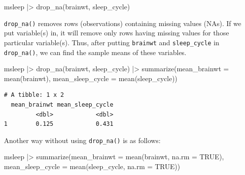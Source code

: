 \documentclass[
  letterpaper,
  DIV=11,
  numbers=noendperiod]{scrreprt}
\newenvironment{Shaded}{\begin{snugshade}}{\end{snugshade}}
\newcommand{\AttributeTok}[1]{\textcolor[rgb]{0.40,0.45,0.13}{#1}}
\newcommand{\ConstantTok}[1]{\textcolor[rgb]{0.56,0.35,0.01}{#1}}
\newcommand{\FunctionTok}[1]{\textcolor[rgb]{0.28,0.35,0.67}{#1}}
\newcommand{\NormalTok}[1]{\textcolor[rgb]{0.00,0.23,0.31}{#1}}
\newcommand{\SpecialCharTok}[1]{\textcolor[rgb]{0.37,0.37,0.37}{#1}}
\begin{document}
\begin{Shaded}
\begin{Highlighting}[]
\NormalTok{msleep }\SpecialCharTok{|\textgreater{}}
  \FunctionTok{drop\_na}\NormalTok{(brainwt, sleep\_cycle)}
\end{Highlighting}
\end{Shaded}

\begin{tcolorbox}[enhanced jigsaw, colbacktitle=quarto-callout-tip-color!10!white, opacitybacktitle=0.6, breakable, left=2mm, leftrule=.75mm, toprule=.15mm, toptitle=1mm, bottomtitle=1mm, colframe=quarto-callout-tip-color-frame, opacityback=0, coltitle=black, arc=.35mm, titlerule=0mm, colback=white, bottomrule=.15mm, title=\textcolor{quarto-callout-tip-color}{\faLightbulb}\hspace{0.5em}{Answer}, rightrule=.15mm]

\texttt{drop\_na()} removes rows (observations) containing missing
values (NAs). If we put variable(s) in, it will remove only rows having
missing values for those particular variable(s). Thus, after putting
\texttt{brainwt} and \texttt{sleep\_cycle} in \texttt{drop\_na()}, we
can find the sample means of these variables.

\begin{Shaded}
\begin{Highlighting}[]
\NormalTok{msleep }\SpecialCharTok{|\textgreater{}}
  \FunctionTok{drop\_na}\NormalTok{(brainwt, sleep\_cycle) }\SpecialCharTok{|\textgreater{}}
  \FunctionTok{summarize}\NormalTok{(}\AttributeTok{mean\_brainwt =} \FunctionTok{mean}\NormalTok{(brainwt),}
            \AttributeTok{mean\_sleep\_cycle =} \FunctionTok{mean}\NormalTok{(sleep\_cycle))}
\end{Highlighting}
\end{Shaded}

\begin{verbatim}
# A tibble: 1 x 2
  mean_brainwt mean_sleep_cycle
         <dbl>            <dbl>
1        0.125            0.431
\end{verbatim}

\end{tcolorbox}

Another way without using \texttt{drop\_na()} is as follows:

\begin{Shaded}
\begin{Highlighting}[]
\NormalTok{msleep }\SpecialCharTok{|\textgreater{}}
  \FunctionTok{summarize}\NormalTok{(}\AttributeTok{mean\_brainwt =} \FunctionTok{mean}\NormalTok{(brainwt, }\AttributeTok{na.rm =} \ConstantTok{TRUE}\NormalTok{),}
            \AttributeTok{mean\_sleep\_cycle =} \FunctionTok{mean}\NormalTok{(sleep\_cycle, }\AttributeTok{na.rm =} \ConstantTok{TRUE}\NormalTok{))}
\end{Highlighting}
\end{Shaded}
\end{document}
